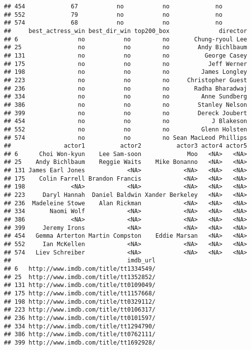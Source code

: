 \documentclass[]{article}
\begin{document}
\begin{verbatim}
## 454             67           no           no             no
## 552             79           no           no             no
## 574             68           no           no             no
##     best_actress_win best_dir_win top200_box              director
## 6                 no           no         no       Chung-ryoul Lee
## 25                no           no         no        Andy Bichlbaum
## 131               no           no         no          George Casey
## 175               no           no         no           Jeff Werner
## 198               no           no         no         James Longley
## 223               no           no         no     Christopher Guest
## 236               no           no         no       Radha Bharadwaj
## 334               no           no         no         Anne Sundberg
## 386               no           no         no        Stanley Nelson
## 399               no           no         no        Dereck Joubert
## 454               no           no         no            J Blakeson
## 552               no           no         no         Glenn Holsten
## 574               no           no         no Sean MacLeod Phillips
##               actor1          actor2          actor3 actor4 actor5
## 6      Choi Won-kyun    Lee Sam-soon             Moo   <NA>   <NA>
## 25    Andy Bichlbaum    Reggie Waits    Mike Bonanno   <NA>   <NA>
## 131 James Earl Jones            <NA>            <NA>   <NA>   <NA>
## 175    Colin Farrell Brandon Francis            <NA>   <NA>   <NA>
## 198             <NA>            <NA>            <NA>   <NA>   <NA>
## 223     Daryl Hannah  Daniel Baldwin Xander Berkeley   <NA>   <NA>
## 236  Madeleine Stowe    Alan Rickman            <NA>   <NA>   <NA>
## 334       Naomi Wolf            <NA>            <NA>   <NA>   <NA>
## 386             <NA>            <NA>            <NA>   <NA>   <NA>
## 399     Jeremy Irons            <NA>            <NA>   <NA>   <NA>
## 454   Gemma Arterton Martin Compston    Eddie Marsan   <NA>   <NA>
## 552     Ian McKellen            <NA>            <NA>   <NA>   <NA>
## 574   Liev Schreiber            <NA>            <NA>   <NA>   <NA>
##                                 imdb_url
## 6   http://www.imdb.com/title/tt1334549/
## 25  http://www.imdb.com/title/tt1352852/
## 131 http://www.imdb.com/title/tt0109049/
## 175 http://www.imdb.com/title/tt1157668/
## 198 http://www.imdb.com/title/tt0329112/
## 223 http://www.imdb.com/title/tt0106317/
## 236 http://www.imdb.com/title/tt0101597/
## 334 http://www.imdb.com/title/tt1294790/
## 386 http://www.imdb.com/title/tt0762111/
## 399 http://www.imdb.com/title/tt1692928/

\end{verbatim}
\end{document}
